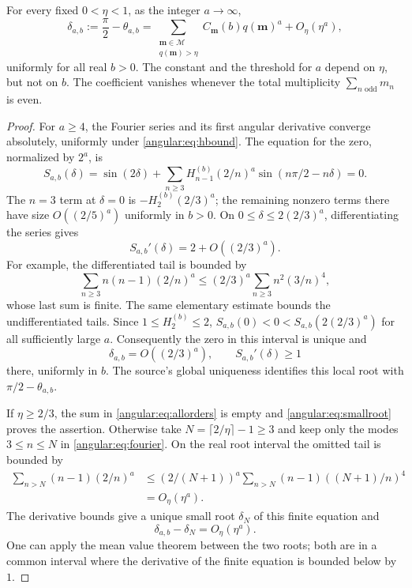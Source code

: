 \begin{theorem}
\label{angular:thm:allorders}
For every fixed $0<\eta<1$, as the integer $a\to\infty$,
\begin{equation}\label{angular:eq:allorders}
 \delta_{a,b}:=\frac\pi2-\theta_{a,b}
 =\sum_{\substack{\mathbf m\in\mathscr M\\q(\mathbf m)>\eta}}
 C_{\mathbf m}(b)q(\mathbf m)^a+O_\eta(\eta^a),
\end{equation}
uniformly for all real $b>0$. The constant and the threshold for $a$
depend on $\eta$, but not on $b$. The coefficient vanishes whenever
the total multiplicity $\sum_{n\text{ odd}}m_n$ is even.
\end{theorem}

\begin{proof}
For $a\geq4$, the Fourier series and its first angular derivative
converge absolutely, uniformly under \eqref{angular:eq:hbound}.
The equation for the zero, normalized by $2^a$, is
\begin{equation}\label{angular:eq:fourier}
 S_{a,b}(\delta)=\sin(2\delta)+
 \sum_{n\geq3}H_{n-1}^{(b)}(2/n)^a
      \sin(n\pi/2-n\delta)=0.
\end{equation}
The $n=3$ term at $\delta=0$ is
$-H_2^{(b)}(2/3)^a$; the remaining nonzero terms there have
size $O((2/5)^a)$ uniformly in $b>0$.  On
$0\leq\delta\leq2(2/3)^a$, differentiating the series gives
\[
 S_{a,b}'(\delta)=2+O((2/3)^a).
\]
For example, the differentiated tail is bounded by
\[
 \sum_{n\geq3}n(n-1)(2/n)^a
 \leq (2/3)^a\sum_{n\geq3}n^2(3/n)^4,
\]
whose last sum is finite. The same elementary estimate bounds the
undifferentiated tails. Since $1\leq H_2^{(b)}\leq2$,
$S_{a,b}(0)<0<S_{a,b}(2(2/3)^a)$ for all sufficiently large $a$.
Consequently the zero in this interval is unique and
\begin{equation}\label{angular:eq:smallroot}
 \delta_{a,b}=O((2/3)^a),\qquad
 S_{a,b}'(\delta)\geq1
\end{equation}
there, uniformly in $b$. The source's global uniqueness identifies
this local root with $\pi/2-\theta_{a,b}$.

If $\eta\geq2/3$, the sum in \eqref{angular:eq:allorders} is empty
and \eqref{angular:eq:smallroot} proves the assertion.  Otherwise
take $N=\lceil2/\eta\rceil-1\geq3$ and keep only the modes
$3\leq n\leq N$ in \eqref{angular:eq:fourier}. On the real root
interval the omitted tail is bounded by
\begin{align*}
 \sum_{n>N}(n-1)(2/n)^a
 &\leq (2/(N+1))^a
       \sum_{n>N}(n-1)((N+1)/n)^4\\
 &=O_\eta(\eta^a).
\end{align*}
The derivative bounds give a unique small root $\delta_N$ of this
finite equation and
\begin{equation}\label{angular:eq:finiteerror}
 \delta_{a,b}-\delta_N=O_\eta(\eta^a).
\end{equation}
One can apply the mean value theorem between the two roots; both
are in a common interval where the derivative of the finite
equation is bounded below by $1$.


\end{proof}

